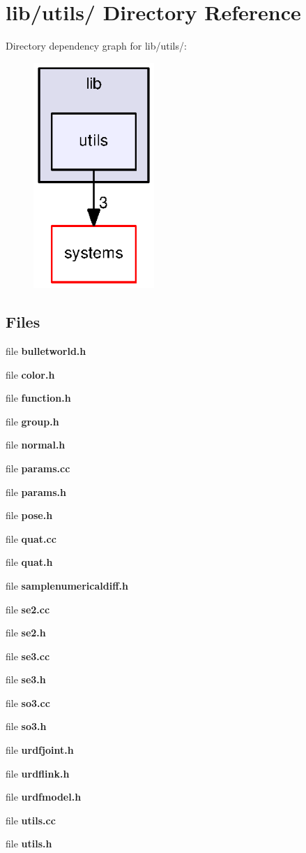 \section{lib/utils/ \-Directory \-Reference}
\label{dir_c16b506037ceb12cf53d7bcd4c07cec4}
\-Directory dependency graph for lib/utils/\-:
\nopagebreak
\begin{figure}[H]
\begin{center}
\leavevmode
\includegraphics[width=130pt]{dir_c16b506037ceb12cf53d7bcd4c07cec4_dep}
\end{center}
\end{figure}
\subsection*{\-Files}
\begin{DoxyCompactItemize}
\item 
file {\bf bulletworld.\-h}
\item 
file {\bf color.\-h}
\item 
file {\bf function.\-h}
\item 
file {\bf group.\-h}
\item 
file {\bf normal.\-h}
\item 
file {\bf params.\-cc}
\item 
file {\bf params.\-h}
\item 
file {\bf pose.\-h}
\item 
file {\bf quat.\-cc}
\item 
file {\bf quat.\-h}
\item 
file {\bf samplenumericaldiff.\-h}
\item 
file {\bf se2.\-cc}
\item 
file {\bf se2.\-h}
\item 
file {\bf se3.\-cc}
\item 
file {\bf se3.\-h}
\item 
file {\bf so3.\-cc}
\item 
file {\bf so3.\-h}
\item 
file {\bf urdfjoint.\-h}
\item 
file {\bf urdflink.\-h}
\item 
file {\bf urdfmodel.\-h}
\item 
file {\bf utils.\-cc}
\item 
file {\bf utils.\-h}
\end{DoxyCompactItemize}
